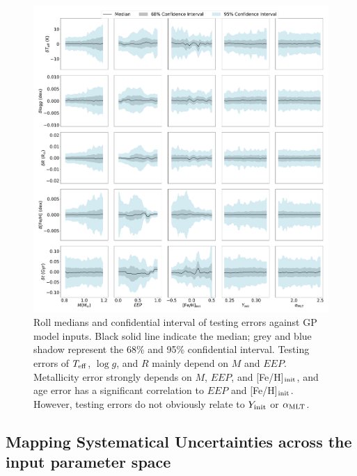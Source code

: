 \begin{figure}
	\includegraphics[width=2.0\columnwidth]{ 5d-testing_vs_inputs.pdf}
    \caption{ Roll medians and confidential interval of testing errors against GP model  inputs. Black solid line indicate the median; grey and blue shadow represent the 68\% and 95\% confidential interval. Testing errors of $T_{\rm eff}$, $\log g$, and $R$ mainly depend on $M$ and $EEP$. Metallicity error strongly depends on $M$, $EEP$, and [Fe/H]$_{\rm init}$, and age error has a significant correlation to $EEP$ and [Fe/H]$_{\rm init}$. However, testing errors do not obviously relate to $Y_{\rm init}$ or $\alpha_{\rm MLT}$. } 
  \label{fig:5d_test_vs_input}
\end{figure}

\subsection{Mapping Systematical Uncertainties across the input parameter space}\label{sec:sys}

